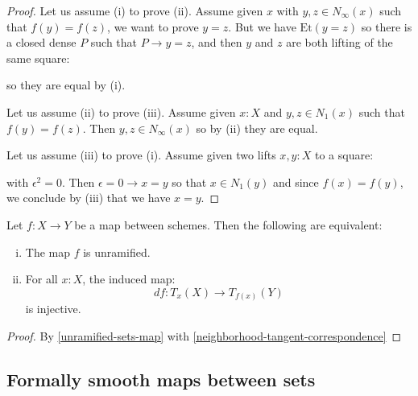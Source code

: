 \begin{proof}
Let us assume (i) to prove (ii). Assume given $x$ with $y,z\in N_\infty(x)$ such that $f(y)=f(z)$, we want to prove $y=z$. But we have $\mathrm{Et}(y=z)$ so there is a closed dense $P$ such that $P\to y=z$, and then $y$ and $z$ are both lifting of the same square: 
 \begin{center}
    \end{center}
so they are equal by (i). 

Let us assume (ii) to prove (iii). Assume given $x:X$ and $y,z\in N_1(x)$ such that $f(y)=f(z)$. Then $y,z\in N_\infty(x)$ so by (ii) they are equal.

Let us assume (iii) to prove (i). Assume given two lifts $x,y:X$ to a square:
 \begin{center}
    \end{center}
    with $\epsilon^2=0$. Then $\epsilon=0 \to x=y$ so that $x\in N_1(y)$ and since $f(x)=f(y)$, we conclude by (iii) that we have $x=y$.
\end{proof}

\begin{corollary}\label{unramified-map-between-scheme-alt}
Let $f:X\to Y$ be a map between schemes. Then the following are equivalent:
\begin{enumerate}[(i)]
\item The map $f$ is unramified. 
\item For all $x:X$, the induced map:
\[df : T_x(X)\to T_{f(x)}(Y)\]
is injective.
\end{enumerate}
\end{corollary}

\begin{proof}
By \cref{unramified-sets-map} with \cref{neighborhood-tangent-correspondence}
\end{proof}

\subsection{Formally smooth maps between sets}

